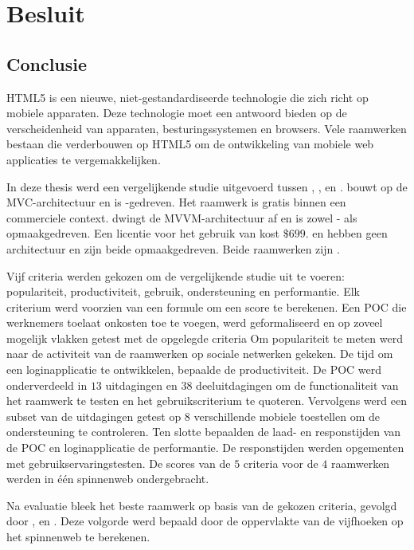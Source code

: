 \chapter{Besluit}
\label{chap:besluit}

\section{Conclusie} %
HTML5 is een nieuwe,  niet-gestandardiseerde technologie die zich richt op mobiele apparaten.
Deze technologie moet een antwoord bieden op de verscheidenheid van apparaten,  besturingssystemen en browsers.
Vele raamwerken bestaan die verderbouwen op HTML5 om de ontwikkeling van mobiele web applicaties te vergemakkelijken.

In deze thesis werd een vergelijkende studie uitgevoerd tussen \st{}, \kendo{},  \jqm{} en \lungo{}.
\st{} bouwt op de MVC-architectuur en is \js-gedreven.
Het raamwerk is gratis binnen een commerciele context.
\kendo{} dwingt de MVVM-architectuur af en is zowel \js- als opmaakgedreven.
Een licentie voor het gebruik van \kendo{} kost $\$699$.
\jqm{} en \lungo{} hebben geen architectuur en zijn beide opmaakgedreven.
Beide raamwerken zijn .

Vijf criteria werden gekozen om de vergelijkende studie uit te voeren:  populariteit,  productiviteit,  gebruik,  ondersteuning en performantie.
Elk criterium werd voorzien van een formule om een score te berekenen.
Een POC die werknemers toelaat onkosten toe te voegen, werd geformaliseerd en op zoveel mogelijk vlakken getest met de opgelegde criteria
Om populariteit te meten werd naar de activiteit van de raamwerken op sociale netwerken gekeken.
De tijd om een loginapplicatie te ontwikkelen, bepaalde de productiviteit.
De POC werd onderverdeeld in $13$ uitdagingen en $38$ deeluitdagingen om de functionaliteit van het raamwerk te testen en het gebruikscriterium te quoteren.
Vervolgens werd een subset van de uitdagingen getest op $8$ verschillende mobiele toestellen om de ondersteuning te controleren.
Ten slotte bepaalden de laad- en responstijden van de POC en loginapplicatie de performantie.
De responstijden werden opgementen met gebruikservaringstesten.
De scores van de $5$ criteria voor de $4$ raamwerken werden in één spinnenweb ondergebracht.

Na evaluatie bleek \jqm{} het beste raamwerk op basis van de gekozen criteria, gevolgd door \kendo{}, \lungo{} en \st{}.
Deze volgorde werd bepaald door de oppervlakte van de vijfhoeken op het spinnenweb te berekenen.


